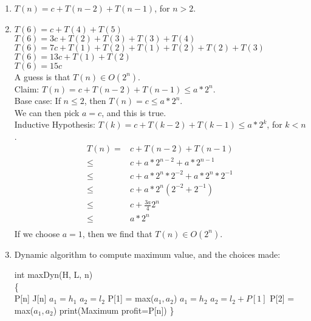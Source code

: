 \documentclass{assignment}
\begin{document}
\begin{problemlist}
\begin{answer}
\begin{enumerate}
\item
$T(n) = c + T(n-2) + T(n-1)$, for $n>2$.
\item
$T(6) = c + T(4) + T(5)$\\
$T(6) = 3c + T(2) + T(3) + T(3) + T(4)$\\
$T(6) = 7c + T(1) + T(2) + T(1) + T(2) + T(2) + T(3)$\\
$T(6) = 13c + T(1) + T(2)$\\
$T(6) = 15c$\\
A guess is that $T(n)\in O(2^n)$.\\
Claim: $T(n) = c + T(n-2) + T(n-1) \le a*2^n$.\\
Base case: If $n \le 2$, then $T(n) = c \le a*2^n$.\\
We can then pick $a=c$, and this is true.\\
Inductive Hypothesis: $T(k) = c + T(k-2) + T(k-1) \le a*2^k$, for $k<n$.\\
\begin{align*}
T(n) =& c + T(n-2) + T(n-1)\\
\le&c + a*2^{n-2} + a*2^{n-1}\\
\le&c + a*2^n*2^{-2} + a*2^n*2^{-1}\\
\le&c + a*2^n(2^{-2} + 2^{-1})\\
\le&c + \frac{3a}{4}2^n\\
\le&a*2^n\\
\end{align*}
If we choose $a=1$, then we find that $T(n)\in O(2^n)$.
\clearpage
\item
Dynamic algorithm to compute maximum value, and the choices made:\\
\IncMargin{3em}
\begin{algorithm}
  int maxDyn(H, L, n)\\\{\\
  \Indp
  P[n]\;
  J[n]\;
  $a_1 = h_1$\;
  $a_2 = l_2$\;
  P[1] = max($a_1, a_2$)\;
  $a_1 = h_2$\;
  $a_2 = l_2 + P[1]$\;
  P[2] = max($a_1, a_2$)\;
  print(Maximum profit=P[n])\;
  \Indm
  \}
\end{algorithm}

\end{enumerate}
\end{answer}
\end{problemlist}
\end{document}
